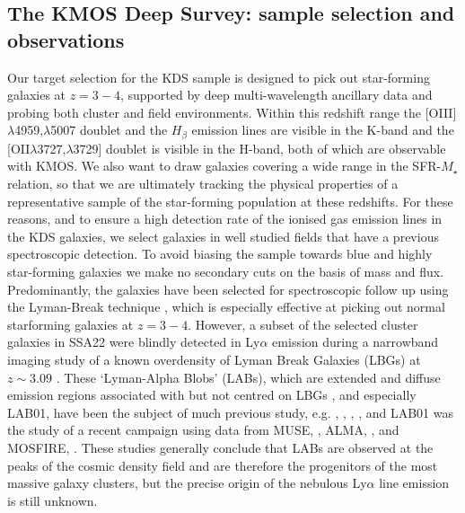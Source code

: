 \documentclass[fleqn,usenatbib]{mn2e}
\begin{document}
\subsection{The KMOS Deep Survey: sample selection and observations}
Our target selection for the KDS sample is designed to pick out star-forming galaxies at $z = 3-4$, supported by deep multi-wavelength ancillary data and probing both cluster and field environments.
Within this redshift range the [OIII]$\lambda$4959,$\lambda$5007 doublet and the $H_{\beta}$ emission lines are visible in the K-band and the [OII$\lambda$3727,$\lambda$3729] doublet is visible in the H-band, both of which are observable with KMOS. 
We also want to draw galaxies covering a wide range in the SFR-$M_{\star}$ relation, so that we are ultimately tracking the physical properties of a representative sample of the star-forming population at these redshifts.
For these reasons, and to ensure a high detection rate of the ionised gas emission lines in the KDS galaxies, we select galaxies in well studied fields that have a previous spectroscopic detection.
To avoid biasing the sample towards blue and highly star-forming galaxies we make no secondary cuts on the basis of mass and flux. %
Predominantly, the galaxies have been selected for spectroscopic follow up using the Lyman-Break technique \citep{Steidel1996}, which is especially effective at picking out normal starforming galaxies at $z = 3-4$.
However, a subset of the selected cluster galaxies in SSA22 were blindly detected in Ly$\alpha$ emission during a narrowband imaging study of a known overdensity of Lyman Break Galaxies (LBGs) at $z \sim 3.09$ \citep{Steidel2000}.
These `Lyman-Alpha Blobs' (LABs), which are extended and diffuse emission regions associated with but not centred on LBGs \citep{Steidel2000}, and especially LAB01, have been the subject of much previous study, e.g. \citep{Bower2004a}, \citep{Matsuda2004,Matsuda2007}, \citep{Geach2006,Geach2014}, \citep{Weijmans2010}, \citep{Hayes2011a} and LAB01 was the study of a recent campaign \citep{Geach2016} using data from MUSE, \citep{Bacon2010}, ALMA, \citep{Wootten2009}, and MOSFIRE, \citep{McLean2012}.
These studies generally conclude that LABs are observed at the peaks of the cosmic density field and are therefore the progenitors of the most massive galaxy clusters, but the precise origin of the nebulous Ly$\alpha$ line emission is still unknown.
\end{document}
